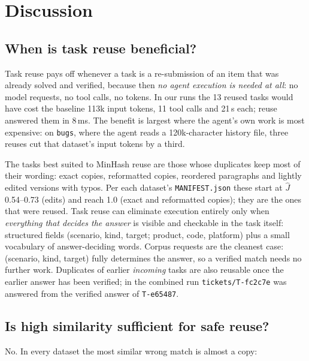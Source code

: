 \documentclass[11pt]{article}
\begin{document}
\section{Discussion}

\subsection{When is task reuse beneficial?}

Task reuse pays off whenever a task is a re-submission of an item that was already solved
and verified, because then \emph{no agent execution is needed at all}: no model requests, no
tool calls, no tokens. In our runs the 13 reused tasks would have cost the baseline 113k
input tokens, 11 tool calls and 21\,s each; reuse answered them in 8\,ms. The benefit is
largest where the agent's own work is most expensive: on \texttt{bugs}, where the agent reads
a 120k-character history file, three reuses cut that dataset's input tokens by a third.

The tasks best suited to MinHash reuse are those whose duplicates keep most of their wording:
exact copies, reformatted copies, reordered paragraphs and lightly edited versions with typos.
Per each dataset's \texttt{MANIFEST.json} these start at $\hat J$ 0.54--0.73 (edits) and reach
1.0 (exact and reformatted copies); they are the ones that were reused.
Task reuse can eliminate execution entirely only when \emph{everything that decides the
answer} is visible and checkable in the task itself: structured fields (scenario, kind,
target; product, code, platform) plus a small vocabulary of answer-deciding words. Corpus
requests are the cleanest case: (scenario, kind, target) fully determines the answer, so a
verified match needs no further work. Duplicates of earlier \emph{incoming} tasks are also
reusable once the earlier answer has been verified; in the combined run
\texttt{tickets/T-fc2c7e} was answered from the verified answer of \texttt{T-e65487}.

\subsection{Is high similarity sufficient for safe reuse?}\label{sec:q2}

No. In every dataset the most similar wrong match is almost a copy:
\end{document}

